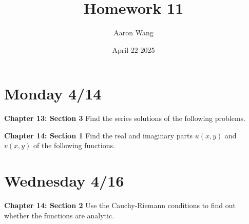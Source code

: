 \documentclass{article}
\title{Homework 11}
\author{Aaron Wang}
\date{April 22 2025}
\begin{document}
\maketitle
\section{Monday 4/14}
\begin{large}
 \textbf{Chapter 13: Section 3} Find the series solutions of the following problems.
\end{large}
\begin{enumerate}
    
\end{enumerate}
\begin{large}
 \textbf{Chapter 14: Section 1} Find the real and imaginary parts $u(x, y)$ and $v(x, y)$ of the following functions.
\end{large}
\begin{enumerate}
    
    
    
    
    
    
    
    
    
    
    
    
\end{enumerate}
\section{Wednesday 4/16}
\begin{large}
 \textbf{Chapter 14: Section 2} Use the Cauchy-Riemann conditions to find out whether the functions are analytic.
\end{large}
\begin{enumerate}
    
    
    
    
    
    
    
    
    
    
    
    
    
    
    
    
\end{enumerate}
\end{document}

